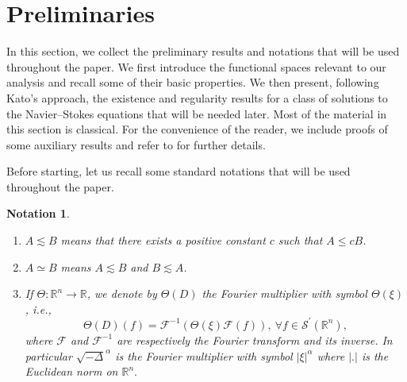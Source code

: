 \documentclass[11pt]{amsart}%
\theoremstyle{plain}
\numberwithin{equation}{section}
\newtheorem{notation}{Notation}
\begin{document}
\section{Preliminaries}
In this section, we collect the preliminary results and notations that will be used throughout the paper. We first introduce the functional spaces relevant to our analysis and recall some of their basic properties. We then present, following Kato's approach, the existence and regularity results for a class of solutions to the Navier--Stokes equations that will be needed later. Most of the material in this section is classical. For the convenience of the reader, we include proofs of some auxiliary results and refer to \cite{BCD,BL,Can,Lem2} for further details.
\par\noindent Before starting, let us recall some standard notations that will be used throughout the paper.
\begin{notation}
\begin{enumerate}
    \par\noindent\item $A\lesssim B$ means that there exists a positive constant $c$ such that $A\leq c B$.
    \item $A\simeq B$ means $A\lesssim B$ and $B\lesssim A$.
    \item If $\Theta:\mathbb{R}^n\to\mathbb{R}$, we denote by $\Theta(D)$ the Fourier multiplier with symbol $\Theta(\xi)$, i.e.,
    \[
    \Theta(D)(f)=\mathcal{F}^{-1}\left(\Theta(\xi)\mathcal{F}(f)\right),~\forall f\in \mathcal{S}^\prime(\mathbb{R}^n),
    \]
where $\mathcal{F}$ and $\mathcal{F}^{-1}$ are respectively the Fourier transform and its inverse. In particular $\sqrt{-\Delta}^\alpha$ is the Fourier multiplier with symbol $\left\vert\xi\right\vert^\alpha$ where $\left\vert . \right\vert$ is the Euclidean norm on $\mathbb{R}^n.$
\end{enumerate}
\end{notation}
\end{document}
